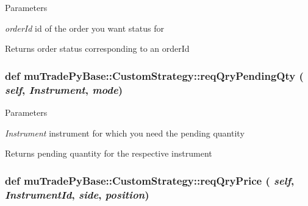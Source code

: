 \begin{DoxyParams}{Parameters}
\item[{\em orderId}]id of the order you want status for \end{DoxyParams}
\begin{DoxyReturn}{Returns}
order status corresponding to an orderId 
\end{DoxyReturn}
\hypertarget{classmuTradePyBase_1_1CustomStrategy_a58d72b142c0336af5b6e569f3ed500c4}{
\subsubsection[{reqQryPendingQty}]{\setlength{\rightskip}{0pt plus 5cm}def muTradePyBase::CustomStrategy::reqQryPendingQty ( {\em self}, \/   {\em Instrument}, \/   {\em mode})}}
\label{classmuTradePyBase_1_1CustomStrategy_a58d72b142c0336af5b6e569f3ed500c4}

\begin{DoxyParams}{Parameters}
\item[{\em Instrument}]instrument for which you need the pending quantity \end{DoxyParams}
\begin{DoxyReturn}{Returns}
pending quantity for the respective instrument 
\end{DoxyReturn}
\hypertarget{classmuTradePyBase_1_1CustomStrategy_a5315fa269b26a64625c3a79362e357e1}{
\subsubsection[{reqQryPrice}]{\setlength{\rightskip}{0pt plus 5cm}def muTradePyBase::CustomStrategy::reqQryPrice ( {\em self}, \/   {\em InstrumentId}, \/   {\em side}, \/   {\em position})}}
\label{classmuTradePyBase_1_1CustomStrategy_a5315fa269b26a64625c3a79362e357e1}

